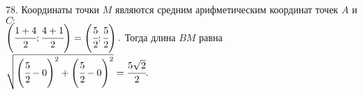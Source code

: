 78. Координаты точки $M$ являются средним арифметическим координат точек $A$ и $C:$\\$ \left(\cfrac{1+4}{2}; \cfrac{4+1}{2}\right)=\left(\cfrac{5}{2};\cfrac{5}{2}\right).$ Тогда длина $BM$ равна $\sqrt{\left(\cfrac{5}{2}-0\right)^2+\left(\cfrac{5}{2}-0\right)^2}=\cfrac{5\sqrt{2}}{2}.$\\
